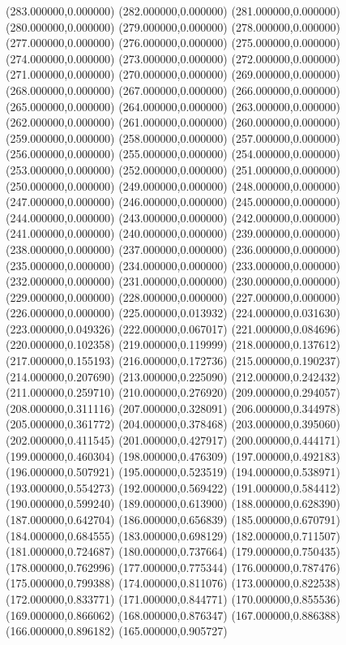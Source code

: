 {(283.000000,0.000000)
(282.000000,0.000000)
(281.000000,0.000000)
(280.000000,0.000000)
(279.000000,0.000000)
(278.000000,0.000000)
(277.000000,0.000000)
(276.000000,0.000000)
(275.000000,0.000000)
(274.000000,0.000000)
(273.000000,0.000000)
(272.000000,0.000000)
(271.000000,0.000000)
(270.000000,0.000000)
(269.000000,0.000000)
(268.000000,0.000000)
(267.000000,0.000000)
(266.000000,0.000000)
(265.000000,0.000000)
(264.000000,0.000000)
(263.000000,0.000000)
(262.000000,0.000000)
(261.000000,0.000000)
(260.000000,0.000000)
(259.000000,0.000000)
(258.000000,0.000000)
(257.000000,0.000000)
(256.000000,0.000000)
(255.000000,0.000000)
(254.000000,0.000000)
(253.000000,0.000000)
(252.000000,0.000000)
(251.000000,0.000000)
(250.000000,0.000000)
(249.000000,0.000000)
(248.000000,0.000000)
(247.000000,0.000000)
(246.000000,0.000000)
(245.000000,0.000000)
(244.000000,0.000000)
(243.000000,0.000000)
(242.000000,0.000000)
(241.000000,0.000000)
(240.000000,0.000000)
(239.000000,0.000000)
(238.000000,0.000000)
(237.000000,0.000000)
(236.000000,0.000000)
(235.000000,0.000000)
(234.000000,0.000000)
(233.000000,0.000000)
(232.000000,0.000000)
(231.000000,0.000000)
(230.000000,0.000000)
(229.000000,0.000000)
(228.000000,0.000000)
(227.000000,0.000000)
(226.000000,0.000000)
(225.000000,0.013932)
(224.000000,0.031630)
(223.000000,0.049326)
(222.000000,0.067017)
(221.000000,0.084696)
(220.000000,0.102358)
(219.000000,0.119999)
(218.000000,0.137612)
(217.000000,0.155193)
(216.000000,0.172736)
(215.000000,0.190237)
(214.000000,0.207690)
(213.000000,0.225090)
(212.000000,0.242432)
(211.000000,0.259710)
(210.000000,0.276920)
(209.000000,0.294057)
(208.000000,0.311116)
(207.000000,0.328091)
(206.000000,0.344978)
(205.000000,0.361772)
(204.000000,0.378468)
(203.000000,0.395060)
(202.000000,0.411545)
(201.000000,0.427917)
(200.000000,0.444171)
(199.000000,0.460304)
(198.000000,0.476309)
(197.000000,0.492183)
(196.000000,0.507921)
(195.000000,0.523519)
(194.000000,0.538971)
(193.000000,0.554273)
(192.000000,0.569422)
(191.000000,0.584412)
(190.000000,0.599240)
(189.000000,0.613900)
(188.000000,0.628390)
(187.000000,0.642704)
(186.000000,0.656839)
(185.000000,0.670791)
(184.000000,0.684555)
(183.000000,0.698129)
(182.000000,0.711507)
(181.000000,0.724687)
(180.000000,0.737664)
(179.000000,0.750435)
(178.000000,0.762996)
(177.000000,0.775344)
(176.000000,0.787476)
(175.000000,0.799388)
(174.000000,0.811076)
(173.000000,0.822538)
(172.000000,0.833771)
(171.000000,0.844771)
(170.000000,0.855536)
(169.000000,0.866062)
(168.000000,0.876347)
(167.000000,0.886388)
(166.000000,0.896182)
(165.000000,0.905727)
}
